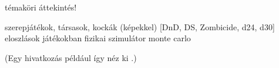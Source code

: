 
témaköri áttekintés!

szerepjátékok, társasok, kockák (képekkel) [DnD, DS, Zombicide, d24, d30]
eloszlások játékokban
fizikai szimulátor
monte carlo

(Egy hivatkozás például így néz ki \cite{coombs1987markup}.)
